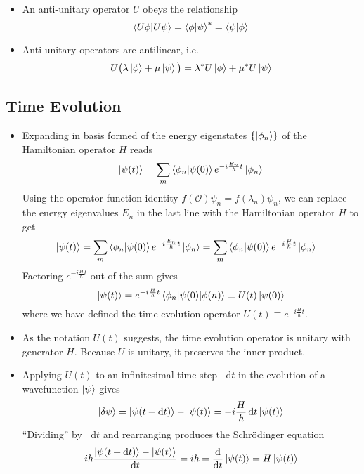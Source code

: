 \documentclass[11pt, a4paper]{article}
\newcommand{\diff}{\mathop{}\!\mathrm{d}} %
\newcommand{\Schro}{Schr\"{o}dinger\xspace}
\newcommand{\Ham}{Hamiltonian\xspace}
\renewcommand{\O}{\mathcal{O}}  %
\newcommand{\p}{\psi}  %
\begin{document}
\begin{itemize}
	\item An anti-unitary operator $ U $ obeys the relationship
	\begin{equation*}
		\braket{U\phi}{U\psi} = \braket{\phi}{\psi}^{*}= \braket{\psi}{\phi}
	\end{equation*}
	
	\item Anti-unitary operators are antilinear, i.e.
	\begin{equation*}
		U\big(\lambda \ket{\phi} + \mu \ket{\psi}\big) = \lambda^{*}U\ket{\phi} + \mu^{*}U\ket{\psi}
	\end{equation*}

\end{itemize}

\subsection{Time Evolution}
\begin{itemize}
	\item Expanding in basis formed of the energy eigenstates $ \{\ket{\phi_{n}}\} $ of the \Ham operator $ H $ reads
	\begin{equation*}
		\ket{\p(t)} = \sum_{m}\braket{\phi_{n}}{\p(0)}e^{-i\frac{E_{n}}{\hbar}t}\ket{\phi_{n}}
	\end{equation*}
	Using the operator function identity $ f(\O)\psi_{n} = f(\lambda_{n} )\psi_{n} $, we can replace the energy eigenvalues $ E_{n} $ in the last line with the \Ham operator $ H $ to get
	\begin{align*}
		\ket{\p(t)} &= \sum_{m}\braket{\phi_{n}}{\p(0)} e^{-i\frac{E_{n}}{\hbar}t}\ket{\phi_{n}} = \sum_{m} \braket{\phi_{n}}{\p(0)} e^{-i\frac{H}{\hbar}t}\ket{\phi_{n}}
	\end{align*}
	Factoring $ e^{-i\frac{H}{\hbar}t} $ out of the sum gives
	\begin{equation*}
		\ket{\p(t)} = e^{-i\frac{H}{\hbar}t} \mel{\phi_{n}}{\p(0)}{\phi(n)} \equiv U(t) \ket{\p(0)}
	\end{equation*}
	where we have defined the time evolution operator $ U(t) \equiv e^{-i\frac{H}{\hbar}t} $.
	
	\item As the notation $ U(t) $ suggests, the time evolution operator is unitary with generator $ H $. Because $ U $ is unitary, it preserves the inner product.
	
	\item Applying $ U(t) $ to an infinitesimal time step $ \diff t $ in the evolution of a wavefunction $ \ket{\p} $ gives
	\begin{equation*}
		\ket{\delta \p} = \ket{\psi(t + \diff t)} - \ket{\p(t)} = -i\frac{H}{\hbar}\diff t \ket{\p(t)}
	\end{equation*}
	``Dividing'' by $ \diff t $ and rearranging produces the \Schro equation
	\begin{equation*}
		i \hbar \frac{\ket{\psi(t + \diff t)} - \ket{\p(t)}}{\diff t} = i \hbar = \dv{t}\ket{\psi(t)} = H \ket{\psi(t)}
	\end{equation*}
\end{itemize}
\end{document}
